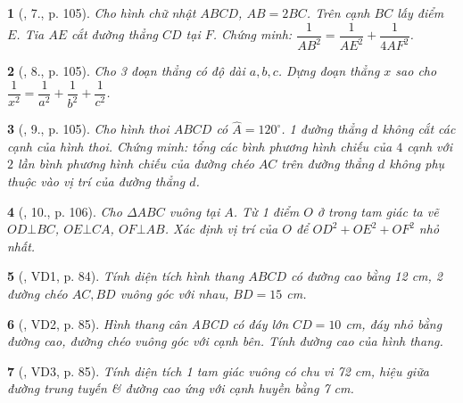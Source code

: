 \documentclass{article}
\newtheorem{baitoan}{}
\begin{document}
\begin{baitoan}[\cite{Tuyen_Toan_9_old}, 7., p. 105]
	Cho hình chữ nhật $ABCD$, $AB = 2BC$. Trên cạnh $BC$ lấy điểm $E$. Tia $AE$ cắt đường thẳng $CD$ tại $F$. Chứng minh: $\dfrac{1}{AB^2} = \dfrac{1}{AE^2} + \dfrac{1}{4AF^2}$.
\end{baitoan}

\begin{baitoan}[\cite{Tuyen_Toan_9_old}, 8., p. 105]
	Cho 3 đoạn thẳng có độ dài $a,b,c$. Dựng đoạn thẳng $x$ sao cho $\dfrac{1}{x^2} = \dfrac{1}{a^2} + \dfrac{1}{b^2} + \dfrac{1}{c^2}$.
\end{baitoan}

\begin{baitoan}[\cite{Tuyen_Toan_9_old}, 9., p. 105]
	Cho hình thoi $ABCD$ có $\widehat{A} = 120^\circ$. 1 đường thẳng $d$ không cắt các cạnh của hình thoi. Chứng minh: tổng các bình phương hình chiếu của $4$ cạnh với $2$ lần bình phương hình chiếu của đường chéo $AC$ trên đường thẳng $d$ không phụ thuộc vào vị trí của đường thẳng $d$.
\end{baitoan}

\begin{baitoan}[\cite{Tuyen_Toan_9_old}, 10., p. 106]
	Cho $\Delta ABC$ vuông tại $A$. Từ 1 điểm $O$ ở trong tam giác ta vẽ $OD\bot BC$, $OE\bot CA$, $OF\bot AB$. Xác định vị trí của $O$ để $OD^2 + OE^2 + OF^2$ nhỏ nhất.
\end{baitoan}

\begin{baitoan}[\cite{Binh_Toan_9_tap_1}, VD1, p. 84]
	Tính diện tích hình thang $ABCD$ có đường cao bằng {\rm12 cm}, 2 đường chéo $AC,BD$ vuông góc với nhau, $BD = 15$ {\rm cm}.
\end{baitoan}

\begin{baitoan}[\cite{Binh_Toan_9_tap_1}, VD2, p. 85]
	Hình thang cân ABCD có đáy lớn $CD = 10$ {\rm cm}, đáy nhỏ bằng đường cao, đường chéo vuông góc với cạnh bên. Tính đường cao của hình thang.
\end{baitoan}

\begin{baitoan}[\cite{Binh_Toan_9_tap_1}, VD3, p. 85]
	Tính diện tích 1 tam giác vuông có chu vi {\rm72 cm}, hiệu giữa đường trung tuyến \& đường cao ứng với cạnh huyền bằng {\rm7 cm}.
\end{baitoan}
\end{document}
